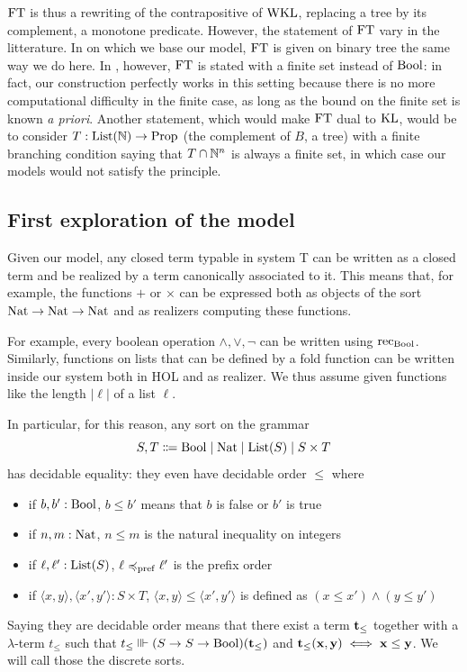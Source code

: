 \documentclass[a4paper,UKenglish,cleveref, autoref, thm-restate]{lipics-v2021}
\begin{document}
$\mathrm{FT}$ is thus a rewriting of the contrapositive of $\mathrm{WKL}$, replacing a tree by its complement, a monotone predicate. However, the statement of $\mathrm{FT}$ vary in the litterature. In \cite{LubRat13} on which we base our model, $\mathrm{FT}$ is given on binary tree the same way we do here. In \cite{BreHer21}, however, $\mathrm{FT}$ is stated with a finite set instead of $\mathrm{Bool}$: in fact, our construction perfectly works in this setting because there is no more computational difficulty in the finite case, as long as the bound on the finite set is known \textit{a priori}. Another statement, which would make $\mathrm{FT}$ dual to $\mathrm{KL}$, would be to consider $T : \mathrm{List}(\mathbb N) \to \mathrm{Prop}$ (the complement of $B$, a tree) with a finite branching condition saying that $T \cap \mathbb N^n$ is always a finite set, in which case our models would not satisfy the principle.

\subsection{First exploration of the model}

Given our model, any closed term typable in system T can be written as a closed term and be realized by a term canonically associated to it. This means that, for example, the functions $+$ or $\times$ can be expressed both as objects of the sort $\mathrm{Nat} \to \mathrm{Nat} \to \mathrm{Nat}$ and as realizers computing these functions.

For example, every boolean operation $\land,\lor,\lnot$ can be written using $\mathrm{rec}_{\mathrm{Bool}}$. Similarly, functions on lists that can be defined by a fold function can be written inside our system both in HOL and as realizer. We thus assume given functions like the length $|\ell|$ of a list $\ell$.

In particular, for this reason, any sort on the grammar
\[S,T\Coloneq \Bool\mid\Nat\mid\List(S)\mid S\times T\]
has decidable equality: they even have decidable order $\leq$ where
\begin{itemize}
\item if $b,b' : \mathrm{Bool}$, $b \leq b'$ means that $b$ is false or $b'$ is true
\item if $n,m : \mathrm{Nat}$, $n \leq m$ is the natural inequality on integers
\item if $\ell,\ell' : \mathrm{List}(S)$, $\ell \preccurlyeq_{\mathrm{pref}} \ell'$ is the prefix order
\item if $\langle x,y\rangle,\langle x',y'\rangle : S \times T$, $\langle x,y\rangle \leq \langle x',y'\rangle$ is defined as $(x \leq x') \land (y\leq y')$
\end{itemize}
Saying they are decidable order means that there exist a term $\mathbf{t}_{\leq}$ together with a $\lambda$-term $t_{\leq}$ such that
$t_{\leq} \Vvdash (S\to S \to \mathrm{Bool})(\mathbf{t}_{\leq})$ and $\mathbf{t}_{\leq}(\mathbf{x},\mathbf{y}) \iff \mathbf{x} \leq \mathbf{y}$.
We will call those the discrete sorts.
\end{document}
